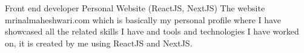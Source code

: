 \begin{cventries}
  \cventry
    {Front end developer}
    {Personal Website \tiny(ReactJS, NextJS)} %
    {} %
    {} %
    {
        The website mrinalmaheshwari.com which is basically my personal profile where I have showcased all the related skills I have and tools and technologies I have worked on, it is created by me using ReactJS and NextJS.
    }





\end{cventries}